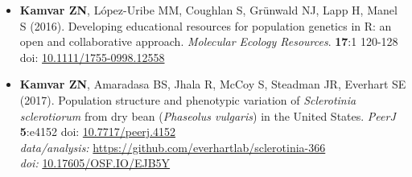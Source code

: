 \begin{itemize}
  \item \textbf{Kamvar ZN}, L\'opez-Uribe MM, Coughlan S, Gr\"unwald NJ, Lapp
  H, Manel S (2016). Developing educational resources for population genetics
  in R: an open and collaborative approach. \textit{Molecular Ecology Resources}.
  \textbf{17}:1 120-128 doi:
  \href{http://doi.org/10.1111/1755-0998.12558}{10.1111/1755-0998.12558}

  \item \textbf{Kamvar ZN}, Amaradasa BS, Jhala R, McCoy S, Steadman JR,
  Everhart SE (2017). Population structure and phenotypic variation of
  \textit{Sclerotinia sclerotiorum} from dry bean (\textit{Phaseolus vulgaris})
  in the United States. \textit{PeerJ} \textbf{5}:e4152 doi: \href{https://doi.org/10.7717/peerj.4152}{10.7717/peerj.4152}\\
    \textit{data/analysis:} \href{https://github.com/everhartlab/sclerotinia-366#readme}{https://github.com/everhartlab/sclerotinia-366}\\
    \textit{doi:\phantom{t/analysis:}}
  \href{https://doi.org/10.17605/OSF.IO/EJB5Y}{10.17605/OSF.IO/EJB5Y}

\end{itemize}

